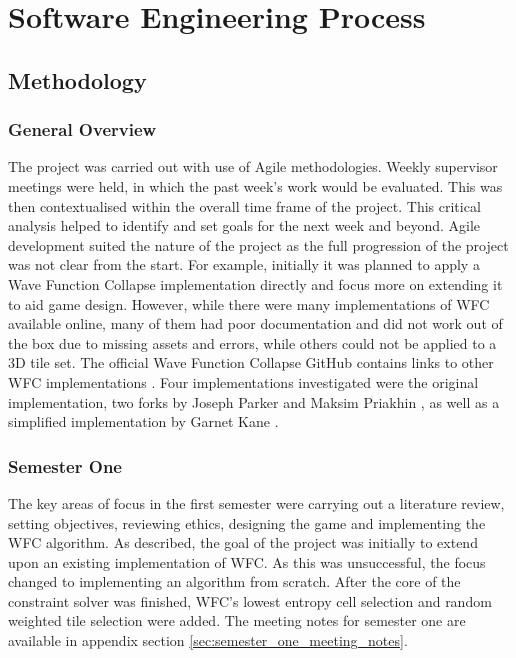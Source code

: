 \chapter{Software Engineering Process}
\section{Methodology}
\subsection{General Overview}
The project was carried out with use of Agile methodologies. Weekly supervisor meetings were held, in which the past week's work would be evaluated. This was then contextualised within the overall time frame of the project. This critical analysis helped to identify and set goals for the next week and beyond. Agile development suited the nature of the project as the full progression of the project was not clear from the start. For example, initially it was planned to apply a Wave Function Collapse implementation directly and focus more on extending it to aid game design. However, while there were many implementations of WFC available online, many of them had poor documentation and did not work out of the box due to missing assets and errors, while others could not be applied to a 3D tile set. The official Wave Function Collapse GitHub contains links to other WFC implementations \cite{Gumin_Wave_Function_Collapse_2016}. Four implementations investigated were the original implementation, two forks by Joseph Parker \cite{unity-WFC} and Maksim Priakhin \cite{unity-WFC-3D}, as well as a simplified implementation by Garnet Kane \cite{Easy_WFC}.

\subsection{Semester One}
The key areas of focus in the first semester were carrying out a literature review, setting objectives, reviewing ethics, designing the game and implementing the WFC algorithm. As described, the goal of the project was initially to extend upon an existing implementation of WFC. As this was unsuccessful, the focus changed to implementing an algorithm from scratch. After the core of the constraint solver was finished, WFC's lowest entropy cell selection and random weighted tile selection were added. The meeting notes for semester one are available in appendix section \ref{sec:semester_one_meeting_notes}.

